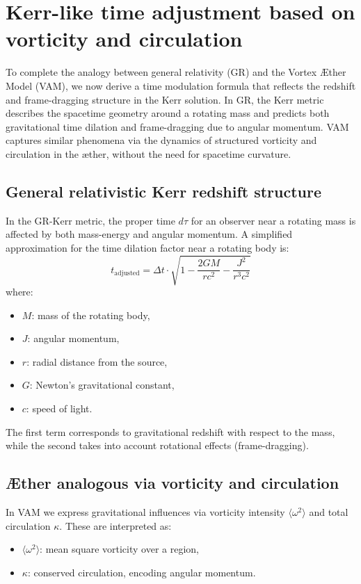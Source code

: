 \section{Kerr-like time adjustment based on vorticity and circulation}

To complete the analogy between general relativity (GR) and the Vortex Æther Model (VAM), we now derive a time modulation formula that reflects the redshift and frame-dragging structure in the Kerr solution. In GR, the Kerr metric describes the spacetime geometry around a rotating mass and predicts both gravitational time dilation and frame-dragging due to angular momentum. VAM captures similar phenomena via the dynamics of structured vorticity and circulation in the æther, without the need for spacetime curvature.

\subsection{General relativistic Kerr redshift structure}

In the GR-Kerr metric, the proper time $d\tau$ for an observer near a rotating mass is affected by both mass-energy and angular momentum. A simplified approximation for the time dilation factor near a rotating body is:
\begin{equation}
    t_\text{adjusted} = \Delta t \cdot \sqrt{1 - \frac{2GM}{rc^2} - \frac{J^2}{r^3c^2}}
    \label{eq:Kerr_time_dilation}
\end{equation}
where:
\begin{itemize}
    \item $M$: mass of the rotating body,
    \item $J$: angular momentum,
    \item $r$: radial distance from the source,
    \item $G$: Newton's gravitational constant,
    \item $c$: speed of light.
\end{itemize}

The first term corresponds to gravitational redshift with respect to the mass, while the second takes into account rotational effects (frame-dragging).

\subsection{Æther analogous via vorticity and circulation}

In VAM we express gravitational influences via vorticity intensity $\langle \omega^2 \rangle$ and total circulation $\kappa$. These are interpreted as:
\begin{itemize}
    \item $\langle \omega^2 \rangle$: mean square vorticity over a region,
    \item $\kappa$: conserved circulation, encoding angular momentum.

\end{itemize}

